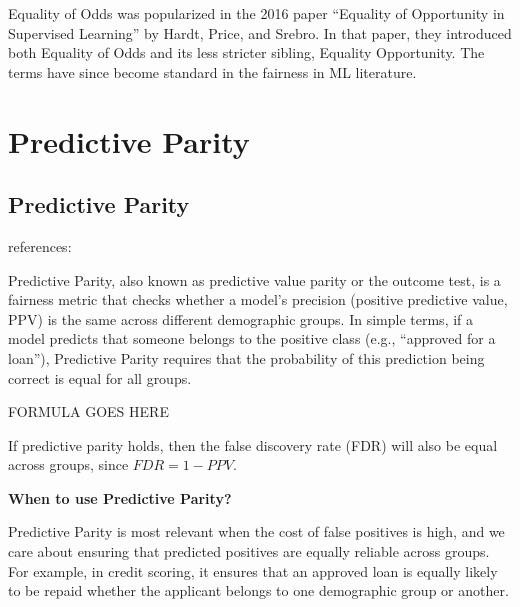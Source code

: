 \clearpage

\thispagestyle{customstyle}

{Equality of Odds was popularized in the 2016 paper “Equality of Opportunity in Supervised Learning” by Hardt, Price, and Srebro. 
In that paper, they introduced both Equality of Odds and its less stricter sibling, Equality Opportunity. The terms have since become standard
in the fairness in ML literature.}


\clearpage
\thispagestyle{biasfairnesstyle}
\section{Predictive Parity}
\subsection{Predictive Parity}

references:

Predictive Parity, also known as predictive value parity or the outcome test, is a fairness metric that checks whether a model’s precision 
(positive predictive value, PPV) is the same across different demographic groups. In simple terms, if a model predicts that someone belongs to
the positive class (e.g., “approved for a loan”), Predictive Parity requires that the probability of this prediction being correct is equal for
all groups.

\begin{center}
    FORMULA GOES HERE
\end{center}

If predictive parity holds, then the false discovery rate (FDR) will also be equal across groups, since $FDR = 1 − PPV$.

\textbf{When to use Predictive Parity?}

Predictive Parity is most relevant when the cost of false positives is high, and we care about ensuring that predicted positives are equally
reliable across groups. For example, in credit scoring, it ensures that an approved loan is equally likely to be repaid whether the applicant
belongs to one demographic group or another.

